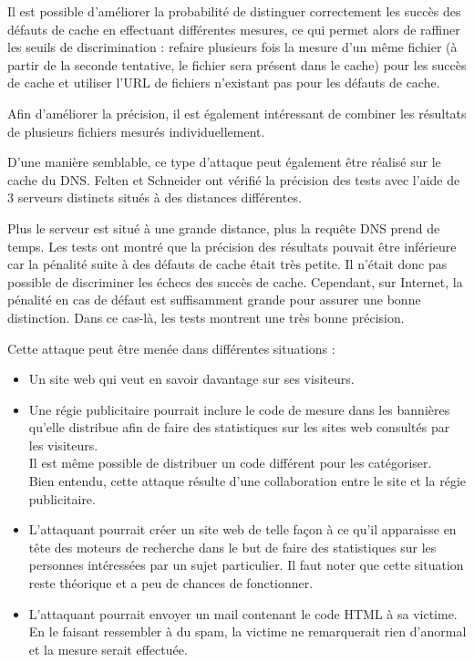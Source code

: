 Il est possible d'améliorer la probabilité de distinguer correctement les succès des défauts de cache en effectuant différentes mesures, ce qui permet alors de raffiner les seuils de discrimination : refaire plusieurs fois la mesure d'un même fichier (à partir de la seconde tentative, le fichier sera présent dans le cache) pour les succès de cache et utiliser l'URL de fichiers n'existant pas pour les défauts de cache.

Afin d'améliorer la précision, il est également intéressant de combiner les résultats de plusieurs fichiers mesurés individuellement.
\newline

D'une manière semblable, ce type d'attaque peut également être réalisé sur le cache du DNS. Felten et Schneider ont vérifié la précision des tests avec l'aide de 3 serveurs distincts situés à des distances différentes.

Plus le serveur est situé à une grande distance, plus la requête DNS prend de temps. Les tests ont montré que la précision des résultats pouvait être inférieure car la pénalité suite à des défauts de cache était très petite. Il n'était donc pas possible de discriminer les échecs des succès de cache. Cependant, sur Internet, la pénalité en cas de défaut est suffisamment grande pour assurer une bonne distinction. Dans ce cas-là, les tests montrent une très bonne précision.
\newline


Cette attaque peut être menée dans différentes situations :
\begin{itemize}
  \item Un site web qui veut en savoir davantage sur ses visiteurs.
  \item Une régie publicitaire pourrait inclure le code de mesure dans les bannières qu'elle distribue afin de faire des statistiques sur les sites web consultés par les visiteurs.\\Il est même possible de distribuer un code différent pour les catégoriser.\\Bien entendu, cette attaque résulte d'une collaboration entre le site et la régie publicitaire.
  \item L'attaquant pourrait créer un site web de telle façon à ce qu'il apparaisse en tête des moteurs de recherche dans le but de faire des statistiques sur les personnes intéressées par un sujet particulier. Il faut noter que cette situation reste théorique et a peu de chances de fonctionner.
  \item L'attaquant pourrait envoyer un mail contenant le code HTML à sa victime.\\En le faisant ressembler à du spam, la victime ne remarquerait rien d'anormal et la mesure serait effectuée.
\end{itemize}

